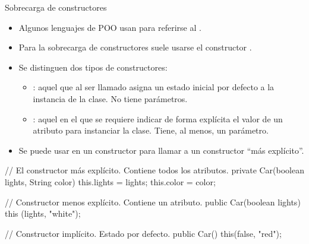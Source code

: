 \documentclass[10pt,envcountsect,spanish]{beamer}
\begin{document}
 
\begin{frame}[fragile]{Sobrecarga de constructores}  

\begin{itemize}
\item Algunos lenguajes de POO usan  para referirse al .
\item Para la sobrecarga de constructores suele usarse el constructor  .

\item Se distinguen dos tipos de constructores:
\begin{itemize} \normalsize
\item {}: aquel que al ser llamado asigna un estado inicial por defecto a la instancia de la clase. No tiene parámetros.
\item {}: aquel en el que se requiere indicar de forma explícita el valor de un atributo para instanciar la clase. Tiene, al menos, un parámetro.
\end{itemize}

\item Se puede usar  en un constructor para llamar a un  constructor ``más explícito''.
\end{itemize}

\begin{code}[caption={Sobrecarga de constructores}]
// El constructor más explícito. Contiene todos los atributos.
private Car(boolean lights, String color) {  
    this.lights = lights;  
    this.color  = color;
}
                                             
// Constructor menos explícito. Contiene un atributo.
public Car(boolean lights) { this (lights, "white"); }

// Constructor implícito. Estado por defecto.
public Car() { this(false, "red"); } 
\end{code}


\end{frame}



\end{document}
